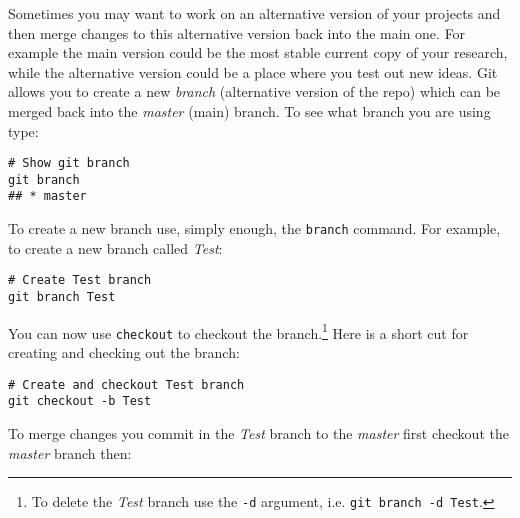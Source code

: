 Sometimes you may want to work on an alternative version of your projects and then merge changes to this alternative version back into the main one. For example the main version could be the most stable current copy of your research, while the alternative version could be a place where you test out new ideas. Git allows you to create a new \emph{branch} (alternative version of the repo) which can be merged back into the \emph{master} (main) branch. To see what branch you are using type:

\begin{knitrout}
\color{fgcolor}\begin{kframe}
\begin{verbatim}
# Show git branch
git branch
## * master
\end{verbatim}
\end{kframe}
\end{knitrout}


To create a new branch use, simply enough, the \texttt{branch} command. For example, to create a new branch called \emph{Test}:

\begin{knitrout}
\color{fgcolor}\begin{kframe}
\begin{verbatim}
# Create Test branch
git branch Test
\end{verbatim}
\end{kframe}
\end{knitrout}


\noindent You can now use \texttt{checkout} to checkout the branch.\footnote{To delete the \emph{Test} branch use the \texttt{-d} argument, i.e. \texttt{git branch -d Test}.} Here is a short cut for creating and checking out the branch:

\begin{knitrout}
\color{fgcolor}\begin{kframe}
\begin{verbatim}
# Create and checkout Test branch
git checkout -b Test
\end{verbatim}
\end{kframe}
\end{knitrout}


\noindent To merge changes you commit in the \emph{Test} branch to the \emph{master} first checkout the \emph{master} branch then:

